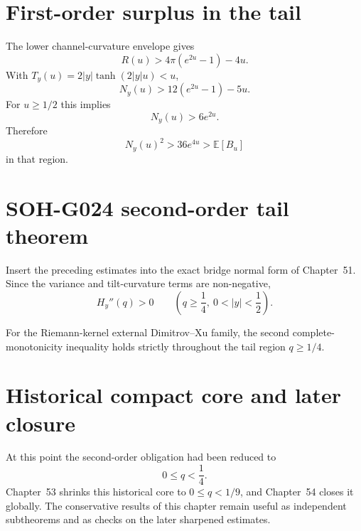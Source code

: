 \section{First-order surplus in the tail}
The lower channel-curvature envelope gives
\[
R(u)>4\pi(e^{2u}-1)-4u.
\]
With $T_y(u)=2|y|\tanh(2|y|u)<u$,
\[
N_y(u)>12(e^{2u}-1)-5u.
\]
For $u\ge1/2$ this implies
\[
\boxed{N_y(u)>6e^{2u}}.
\]
Therefore
\[
N_y(u)^2>36e^{4u}>\mathbb E[B_u]
\]
in that region.

\section{SOH-G024 second-order tail theorem}
Insert the preceding estimates into the exact bridge normal form of Chapter~51. Since the variance and tilt-curvature terms are non-negative,
\[
\boxed{H_y''(q)>0\qquad\left(q\ge\frac14,\ 0<|y|<\frac12\right).}
\]

\begin{theorem}
For the Riemann-kernel external Dimitrov--Xu family, the second complete-monotonicity inequality holds strictly throughout the tail region $q\ge1/4$.
\end{theorem}

\section{Historical compact core and later closure}
At this point the second-order obligation had been reduced to
\[
\boxed{0\le q<\frac14}.
\]
Chapter~53 shrinks this historical core to $0\le q<1/9$, and Chapter~54 closes it globally. The conservative results of this chapter remain useful as independent subtheorems and as checks on the later sharpened estimates.

